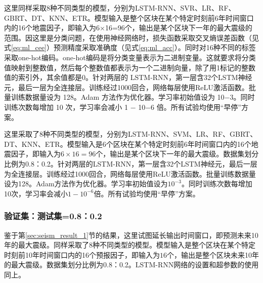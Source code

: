 这里同样采取8种不同类型的模型，分别为LSTM-RNN、SVR、LR、RF、GBRT、DT、KNN、ETR。模型输入是整个区块在某个特定时刻前6年时间窗口内的16个地震因子，即输入为6×16=96个，输出是某个区块下一年的最大震级的范围。因这里是分类问题，在使用神经网络时，损失函数采取交叉熵误差函数（见式\ref{eq:ml_cee}）预测精度采取准确度（见式\ref{eq:ml_acc}）。同时对16种不同的标签采取one-hot编码。one-hot编码是将分类变量表示为二进制变量。这就要求将分类值映射到整数值，然后每个整数值都表示为一个二进制向量，除了用1标记的整数值的索引外，其余值都是0。针对两层的 LSTM-RNN，第一层含32个LSTM神经元，最后一层为全连接层。训练经过1000回合，网络每层使用ReLU激活函数。批量训练数据量设为 128。Adam 方法作为优化器。学习率初始值设为 10−3。同时训练次数每增加 10 次，学习率会减小 1 − 10−6 倍。所有试验均使用“早停”方案。

这里采取了8种不同类型的模型，分别为LSTM-RNN、SVM、LR、RF、GBRT、DT、KNN、ETR。模型输入是6个区块在某个特定时刻前6年时间窗口内的16个地震因子，即输入为$6\times 16=96$个，输出是某个区块下一年的最大震级。数据集划分比例为0.8：0.2。针对两层的LSTM-RNN，第一层含32个LSTM神经元，最后一层为全连接层。训练经过1000回合，网络每层使用ReLU激活函数。批量训练数据量设为128。Adam方法作为优化器。学习率初始值设为$10^{-3}$。同时训练次数每增加10次，学习率会减小$1-10^{-6}$倍。所有试验均使用“早停”方案。

\subsubsection{验证集：测试集=0.8：0.2}\label{sec:seism_result_10_80_class}

鉴于第\ref{sec:seism_result_1}节的结果，这里试图延长输出时间窗口，即预测未来10年的最大震级。同样采取了8种不同类型的模型。模型输入是整个区块在某个特定时刻前10年时间窗口内的16个预报因子，即输入为$16$个，输出是整个区块未来10年的最大震级。数据集划分比例为0.8：0.2。LSTM-RNN网络的设置和超参数的使用同上。

